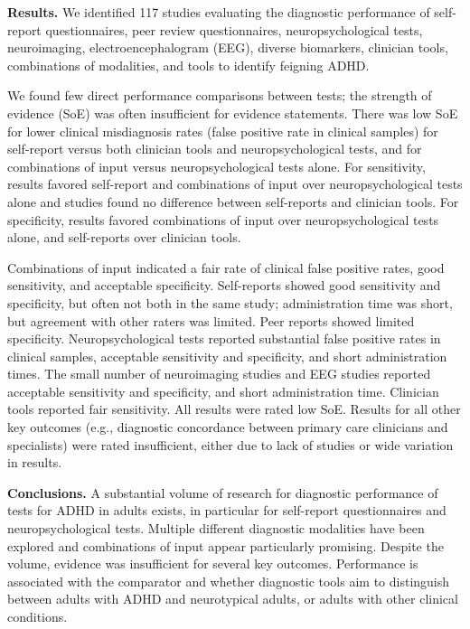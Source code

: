 \documentclass[
  12pt,
  letterpaper,
]{article}
\renewcommand{\[}{\begin{singlespace}\oldDisplayMath}
\renewcommand{\]}{\endoldDisplayMath\end{singlespace}\vspace{\baselineskip}}
\begin{document}
\textbf{Results.} We identified 117 studies evaluating the diagnostic
performance of self-report questionnaires, peer review questionnaires,
neuropsychological tests, neuroimaging, electroencephalogram (EEG),
diverse biomarkers, clinician tools, combinations of modalities, and
tools to identify feigning ADHD.

We found few direct performance comparisons between tests; the strength
of evidence (SoE) was often insufficient for evidence statements. There
was low SoE for lower clinical misdiagnosis rates (false positive rate
in clinical samples) for self-report versus both clinician tools and
neuropsychological tests, and for combinations of input versus
neuropsychological tests alone. For sensitivity, results favored
self-report and combinations of input over neuropsychological tests
alone and studies found no difference between self-reports and clinician
tools. For specificity, results favored combinations of input over
neuropsychological tests alone, and self-reports over clinician tools.

Combinations of input indicated a fair rate of clinical false positive
rates, good sensitivity, and acceptable specificity. Self-reports showed
good sensitivity and specificity, but often not both in the same study;
administration time was short, but agreement with other raters was
limited. Peer reports showed limited specificity. Neuropsychological
tests reported substantial false positive rates in clinical samples,
acceptable sensitivity and specificity, and short administration times.
The small number of neuroimaging studies and EEG studies reported
acceptable sensitivity and specificity, and short administration time.
Clinician tools reported fair sensitivity. All results were rated low
SoE. Results for all other key outcomes (e.g., diagnostic concordance
between primary care clinicians and specialists) were rated
insufficient, either due to lack of studies or wide variation in
results.

\textbf{Conclusions.} A substantial volume of research for diagnostic
performance of tests for ADHD in adults exists, in particular for
self-report questionnaires and neuropsychological tests. Multiple
different diagnostic modalities have been explored and combinations of
input appear particularly promising. Despite the volume, evidence was
insufficient for several key outcomes. Performance is associated with
the comparator and whether diagnostic tools aim to distinguish between
adults with ADHD and neurotypical adults, or adults with other clinical
conditions.
\end{document}
